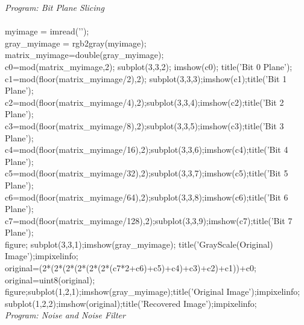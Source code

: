 \documentclass[12pt]{article}
\begin{document}
\emph{Program: Bit Plane Slicing}\\\\
myimage = imread('');\\
gray\_myimage = rgb2gray(myimage);\\
matrix\_myimage=double(gray\_myimage);\\
c0=mod(matrix\_myimage,2); subplot(3,3,2); imshow(c0); title('Bit 0 Plane'); \\
c1=mod(floor(matrix\_myimage/2),2); subplot(3,3,3);imshow(c1);title('Bit 1 Plane');\\
c2=mod(floor(matrix\_myimage/4),2);subplot(3,3,4);imshow(c2);title('Bit 2 Plane');\\
c3=mod(floor(matrix\_myimage/8),2);subplot(3,3,5);imshow(c3);title('Bit 3 Plane');\\
c4=mod(floor(matrix\_myimage/16),2);subplot(3,3,6);imshow(c4);title('Bit 4 Plane');\\
c5=mod(floor(matrix\_myimage/32),2);subplot(3,3,7);imshow(c5);title('Bit 5 Plane');\\
c6=mod(floor(matrix\_myimage/64),2);subplot(3,3,8);imshow(c6);title('Bit 6 Plane');\\
c7=mod(floor(matrix\_myimage/128),2);subplot(3,3,9);imshow(c7);title('Bit 7 Plane');\\
figure; subplot(3,3,1);imshow(gray\_myimage); title('GrayScale(Original) Image');impixelinfo;\\
original=(2*(2*(2*(2*(2*(2*(c7*2+c6)+c5)+c4)+c3)+c2)+c1))+c0; original=uint8(original);\\
figure;subplot(1,2,1);imshow(gray\_myimage);title('Original Image');impixelinfo;\\
subplot(1,2,2);imshow(original);title('Recovered Image');impixelinfo;\\

\emph{Program: Noise and Noise Filter}


\pagebreak
\end{document}
